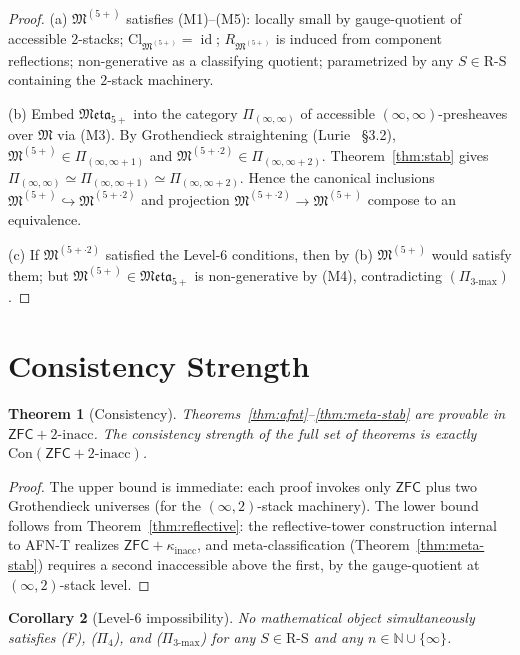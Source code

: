\documentclass[11pt]{article}
\theoremstyle{plain}
\newtheorem{theorem}{Theorem}[section]
\newtheorem{corollary}[theorem]{Corollary}
\theoremstyle{definition}
\newcommand{\RS}{\mathrm{R\text{-}S}}
\newcommand{\fM}{\mathfrak{M}}
\newcommand{\Meta}{\mathfrak{Meta}}
\newcommand{\Cl}{\mathrm{Cl}}
\newcommand{\Con}{\mathrm{Con}}
\newcommand{\ZFC}{\mathsf{ZFC}}
\DeclareMathOperator{\id}{id}
\begin{document}
\begin{proof}
(a) $\fM^{(5+)}$ satisfies (M1)--(M5): locally small by gauge-quotient of accessible $2$-stacks; $\Cl_{\fM^{(5+)}} = \id$; $R_{\fM^{(5+)}}$ is induced from component reflections; non-generative as a classifying quotient; parametrized by any $S \in \RS$ containing the $2$-stack machinery.

(b) Embed $\Meta_{5+}$ into the category $\Pi_{(\infty, \infty)}$ of accessible $(\infty, \infty)$-presheaves over $\fM$ via (M3). By Grothendieck straightening (Lurie~\cite{LurieHTT} \S 3.2), $\fM^{(5+)} \in \Pi_{(\infty, \infty + 1)}$ and $\fM^{(5+ \cdot 2)} \in \Pi_{(\infty, \infty + 2)}$. Theorem~\ref{thm:stab} gives $\Pi_{(\infty, \infty)} \simeq \Pi_{(\infty, \infty + 1)} \simeq \Pi_{(\infty, \infty + 2)}$. Hence the canonical inclusions $\fM^{(5+)} \hookrightarrow \fM^{(5+ \cdot 2)}$ and projection $\fM^{(5+ \cdot 2)} \to \fM^{(5+)}$ compose to an equivalence.

(c) If $\fM^{(5+ \cdot 2)}$ satisfied the Level-6 conditions, then by (b) $\fM^{(5+)}$ would satisfy them; but $\fM^{(5+)} \in \Meta_{5+}$ is non-generative by (M4), contradicting $(\Pi_{3\text{-max}})$.
\end{proof}

\section{Consistency Strength}\label{sec:cons}

\begin{theorem}[Consistency]\label{thm:consistency}
Theorems~\ref{thm:afnt}--\ref{thm:meta-stab} are provable in $\ZFC + 2\text{-inacc}$. The consistency strength of the full set of theorems is exactly $\Con(\ZFC + 2\text{-inacc})$.
\end{theorem}

\begin{proof}
The upper bound is immediate: each proof invokes only $\ZFC$ plus two Grothendieck universes (for the $(\infty, 2)$-stack machinery). The lower bound follows from Theorem~\ref{thm:reflective}: the reflective-tower construction internal to AFN-T realizes $\ZFC + \kappa_{\mathrm{inacc}}$, and meta-classification (Theorem~\ref{thm:meta-stab}) requires a second inaccessible above the first, by the gauge-quotient at $(\infty, 2)$-stack level.
\end{proof}

\begin{corollary}[Level-6 impossibility]\label{cor:level-6}
No mathematical object simultaneously satisfies \emph{(F)}, \emph{($\Pi_4$)}, and \emph{($\Pi_{3\text{-max}}$)} for any $S \in \RS$ and any $n \in \mathbb{N} \cup \{\infty\}$.
\end{corollary}
\end{document}
